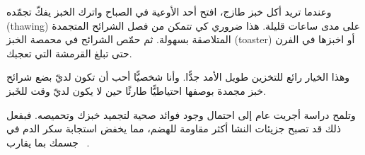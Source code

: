 وعندما تريد أكل خبز طازج، افتح أحد الأوعية في الصباح واترك الخبز يفكّ تجمّده \textenglish{(thawing)} على مدى ساعات قليلة. هذا ضروري كي تتمكن من فصل الشرائح المتجمدة المتلاصقة بسهولة. ثم حمّص الشرائح في محمصة الخبز \textenglish{(toaster)} أو اخبزها في الفرن حتى تبلغ القرمشة التي تعجبك.

وهذا الخيار رائع للتخزين طويل الأمد جدًّا. وأنا شخصيًّا أحب أن تكون لديّ بضع شرائح خبز مجمدة بوصفها احتياطيًّا طارئًا حين لا يكون لديّ وقت للخَبز.

وتلمح دراسة أجريت عام  إلى احتمال وجود فوائد صحية لتجميد خبزك وتحميصه. فبفعل ذلك قد تصبح جزيئات النشا أكثر مقاومة للهضم، مما يخفض استجابة سكر الدم في جسمك بما يقارب ~\cite{freezing+toasting+bread}.
